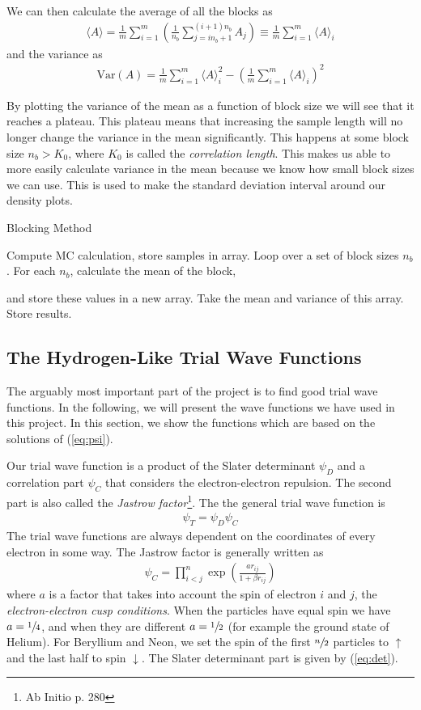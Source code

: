 \documentclass[twocolumns, a4paper,11pt,fleqn]{extarticle}
\newcommand{\eq}[1]{{\small\begin{align*}#1\end{align*}}}
\newcommand{\Var}[1]{\mathrm{Var}(#1)}
\begin{document}
We can then calculate the average of all the blocks as
\eq{
  \langle A \rangle = 
  \frac{1}{m}\sum_{i=1}^m \left(
    \frac{1}{n_b}\sum_{j=in_b+1}^{(i+1)n_b} A_j \right)
  \equiv \frac{1}{m}\sum_{i=1}^m \langle A \rangle_i
}
and the variance as
\eq{
  \Var{A}=
  \frac{1}{m}\sum_{i=1}^m \langle A \rangle_i^2
  -\left(\frac{1}{m}\sum_{i=1}^m \langle A \rangle_i\right)^2
}

By plotting the variance of the mean as a function of block size we 
will see that it reaches a plateau.
This plateau means that increasing the sample length will no longer
change the variance in the mean significantly. 
This happens at some block size $n_b > K_0$, 
where $K_0$ is called the \textit{correlation length}. 
This makes us able to more easily calculate variance in the mean because we know how small block sizes we can use. 
This is used to make the standard deviation interval around our density plots. 

\begin{algorithm}[H]
	\caption{Blocking Method}\label{algo:block}
  \begin{algorithmic}[1]
      \State Compute MC calculation, store samples in array.
      \State Loop over a set of block sizes $n_b$.
      \State For each $n_b$, calculate the mean of the block,
      
        and store these values in a new array.
      \State Take the mean and variance of this array.
      \State Store results.
    \EndProcedure
  \end{algorithmic}
\end{algorithm}

\subsection{The Hydrogen-Like Trial Wave Functions}
The arguably most important part of the project is to find good
trial wave functions. In the following, we will present
the wave functions we have used in this project.
In this section, we show the functions which are based on
the solutions of (\ref{eq:psi}).

Our trial wave function is a product of the Slater determinant $\psi_D$ and
a correlation part $\psi_C$ that considers the electron-electron repulsion.
The second part is also called the \textit{Jastrow factor}\footnote{Ab Initio p. 280}.
The the general trial wave function is
\eq{
  \psi_T = \psi_D \psi_C
}
The trial wave functions are always dependent on the coordinates of every
electron in some way.
The Jastrow factor is generally written as
\eq{
  \psi_C = \prod_{i<j}^{n}\exp{\left(\frac{a r_{ij}}{1+\beta r_{ij}}\right)}
}
where $a$ is a factor that takes into account the spin of electron $i$ and $j$,
the \textit{electron-electron cusp conditions}.
When the particles have equal spin we have $a=\sfrac{1}{4}$,
and when they are different $a=\sfrac{1}{2}$ (for example the ground state of Helium).
For Beryllium and Neon, we set the spin of the first $\sfrac{n}{2}$ particles to
$\uparrow$ and the last half to spin $\downarrow$.
The Slater determinant part is given by (\ref{eq:det}).
\end{document}
